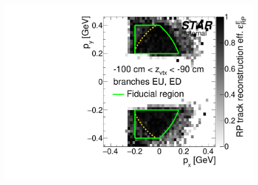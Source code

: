 \begin{figure}[hb]
{  \includegraphics[width=\linewidth,page=38]{graphics/corrections/mcFullEffPxPy.pdf}
}%
\end{figure}





